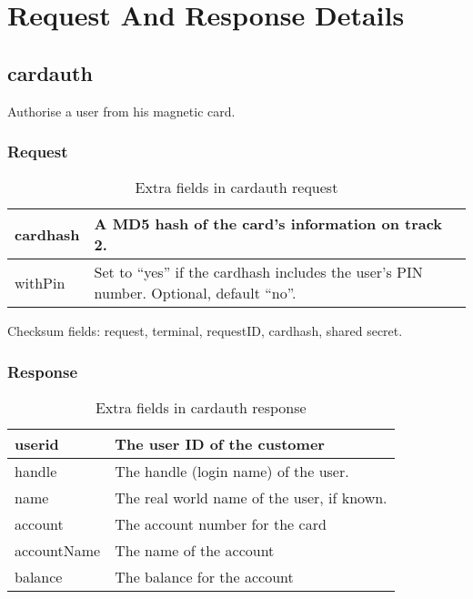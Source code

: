 \documentclass[a4paper,11pt]{article}
\newcommand{\code}[1]
   {\textsf{#1}}
\begin{document}
\section{Request And Response Details}\label{sec:requestDetails} 



\subsection{cardauth}

Authorise a user from his magnetic card.

\subsubsection{Request}
\begin{table}[!h]
  \begin{tabular}{|l|l|}
    \hline
    cardhash & A MD5 hash of the card's information on track 2.\\\hline
    withPin  & Set to ``yes'' if the cardhash includes the user's PIN
               number. Optional, default ``no''. \\\hline
  \end{tabular} 
  \caption{Extra fields in \code{cardauth} request}
\end{table}

Checksum fields: request, terminal, requestID, cardhash, shared secret.

\subsubsection{Response}
\begin{table}[!h]
  \begin{tabular}{|l|l|}
    \hline
      userid  & The user ID of the customer \\\hline
      handle  & The handle (login name) of the user.\\\hline
      name    & The real world name of the user, if known.\\\hline
      account & The account number for the card\\\hline
      accountName & The name of the account\\\hline
      balance & The balance for the account\\\hline
  \end{tabular} 
  \caption{Extra fields in \code{cardauth} response}
\end{table}
\end{document}
